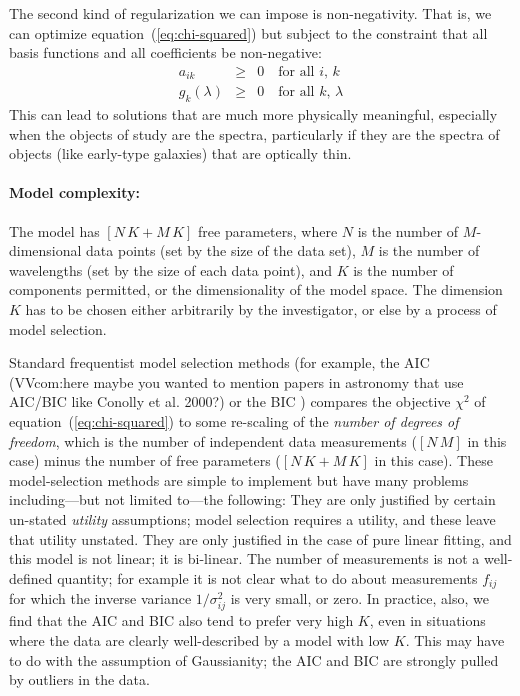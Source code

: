 \documentclass[12pt,preprint]{aastex}
\newcommand{\equationname}{equation}
\begin{document}
The second kind of regularization we can impose is non-negativity.
That is, we can optimize \equationname~(\ref{eq:chi-squared}) but subject
to the constraint that all basis functions and all coefficients be
non-negative:
\begin{eqnarray}\label{eq:non-negative}\displaystyle
a_{ik} & \geq & 0 \quad\mbox{for all $i$, $k$} \nonumber\\
g_{k}(\lambda) & \geq & 0 \quad\mbox{for all $k$, $\lambda$}
\end{eqnarray}
This can lead to solutions that are much more physically meaningful,
especially when the objects of study are the spectra, particularly if
they are the spectra of objects (like early-type galaxies) that are
optically thin.

\paragraph{Model complexity:}
The model has $[N\,K + M\,K]$ free parameters, where $N$ is the number
of $M$-dimensional data points (set by the size of the data set), $M$
is the number of wavelengths (set by the size of each data point), and
$K$ is the number of components permitted, or the dimensionality of
the model space.  The dimension $K$ has to be chosen either
arbitrarily by the investigator, or else by a process of model
selection.

Standard frequentist model selection methods (for example, the AIC
\citep{aic} (VVcom:here maybe you wanted to mention papers in 
astronomy that use AIC/BIC like Conolly et al. 2000?) or the BIC \citep{bic}) 
compares the objective $\chi^2$ of
\equationname~(\ref{eq:chi-squared}) to some re-scaling of the
\emph{number of degrees of freedom}, which is the number of independent
data measurements ($[N\,M]$ in this case) minus the number of free
parameters ($[N\,K + M\,K]$ in this case).  These model-selection
methods are simple to implement but have many problems
including---but not limited to---the following: They are only
justified by certain un-stated \emph{utility} assumptions; model
selection requires a utility, and these leave that utility unstated.
They are only justified in the case of pure linear fitting, and this
model is not linear; it is bi-linear.  The number of measurements is
not a well-defined quantity; for example it is not clear what to do
about measurements $f_{ij}$ for which the inverse variance
$1/\sigma^2_{ij}$ is very small, or zero.  In practice, also, we find
that the AIC and BIC also tend to prefer very high $K$, even in
situations where the data are clearly well-described by a model with
low $K$.  This may have to do with the assumption of Gaussianity; the
AIC and BIC are strongly pulled by outliers in the data.
\end{document}
